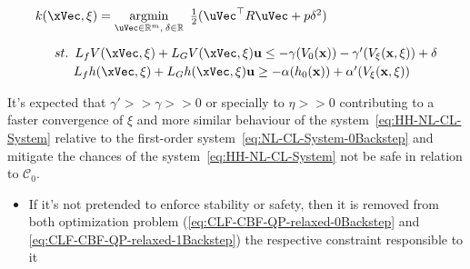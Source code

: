 \begin{equation}
    \begin{array}{l}
        k(\xVec, \mathbf{\xi}) = \underset{\uVec \in \mathbb{R}^m, \hspace{0.2em} \delta \in \mathbb{R}}{\mathrm{argmin}} \quad \hspace{-0.5em} \frac{1}{2} (\uVec^\top R \uVec + p\delta^2 ) \vspace{1em} \\ 
        \quad \hspace{0.5em}  st. \hspace{0.5em} L_fV(\xVec, \mathbf{\xi}) + L_GV(\xVec, \mathbf{\xi})\mathbf{u} \leq -\gamma(V_0(\mathbf{x})) -\gamma'(V_{\mathbf{\xi}}(\mathbf{x}, \mathbf{\xi})) + \delta \vspace{0.25em}\\
        \quad \quad \hspace{1em}                 L_fh(\xVec, \mathbf{\xi}) + L_Gh(\xVec, \mathbf{\xi})\mathbf{u} \geq -\alpha(h_0(\mathbf{x})) + \alpha'(V_{\mathbf{\xi}}(\mathbf{x}, \mathbf{\xi}))
    \end{array}
 \label{eq:CLF-CBF-QP-relaxed-1Backstep}
\end{equation}

It's expected that  \( \gamma' >> \gamma >> 0\) or specially to \(\eta >>0\) contributing to a faster convergence of \(\xi\) and more similar behaviour of the system~\ref{eq:HH-NL-CL-System} relative to the first-order system~\ref{eq:NL-CL-System-0Backstep} and mitigate the chances of the system~\ref{eq:HH-NL-CL-System} not be safe in relation to \(\mathcal{C}_0\). \\

\begin{tcolorbox}[colback=blue!5!white,colframe=blue!35!white,title=Notes:]
\begin{itemize}
    \item If it's not pretended to enforce stability or safety, then it is removed from both optimization problem (\ref{eq:CLF-CBF-QP-relaxed-0Backstep} and \ref{eq:CLF-CBF-QP-relaxed-1Backstep}) the respective constraint responsible to it
\end{itemize}
\end{tcolorbox} 



